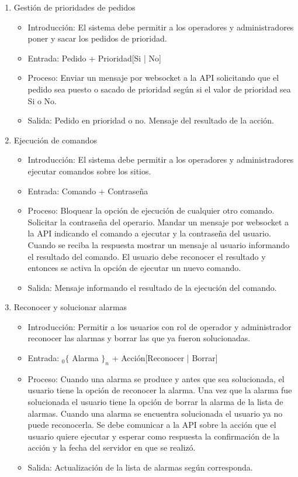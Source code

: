 \begin{enumerate}
			\item Gestión de prioridades de pedidos
				\begin{itemize}
					\item Introducción: El sistema debe permitir a los operadores y administradores poner y sacar los pedidos de prioridad.
					\item Entrada: Pedido + Prioridad[Si | No]
					\item Proceso: Enviar un mensaje por websocket a la API solicitando que el pedido sea puesto o sacado de prioridad según si el valor de prioridad sea Si o No.
					\item Salida: Pedido en prioridad o no. Mensaje del resultado de la acción.
				\end{itemize}
				
			\item Ejecución de comandos
				\begin{itemize}
					\item Introducción: El sistema debe permitir a los operadores y administradores ejecutar comandos sobre los sitios.
					\item Entrada: Comando + Contraseña
					\item Proceso: Bloquear la opción de ejecución de cualquier otro comando. Solicitar la contraseña del operario. Mandar un mensaje por websocket a la API indicando el comando a ejecutar y la contraseña del usuario. Cuando se reciba la respuesta mostrar un mensaje al usuario informando el resultado del comando. El usuario debe reconocer el resultado y entonces se activa la opción de ejecutar un nuevo comando.
					\item Salida:	Mensaje informando el resultado de la ejecución del comando.
				\end{itemize}
				
			\item Reconocer y solucionar alarmas
				\begin{itemize}
					\item Introducción: Permitir a los usuarios con rol de operador y administrador reconocer las alarmas y borrar las que ya fueron solucionadas.
					\item Entrada: ${}_{0}\{$ Alarma $\}_n$ + Acción[Reconocer | Borrar]
					\item Proceso: Cuando una alarma se produce y antes que sea solucionada, el usuario tiene la opción de reconocer la alarma. Una vez que la alarma fue solucionada el usuario tiene la opción de borrar la alarma de la lista de alarmas. Cuando una alarma se encuentra solucionada el usuario ya no puede reconocerla. Se debe comunicar a la API sobre la acción que el usuario quiere ejecutar y esperar como respuesta la confirmación de la acción y la fecha del servidor en que se realizó.
					\item Salida:	Actualización de la lista de alarmas según corresponda.
				\end{itemize}
				

\end{enumerate}
